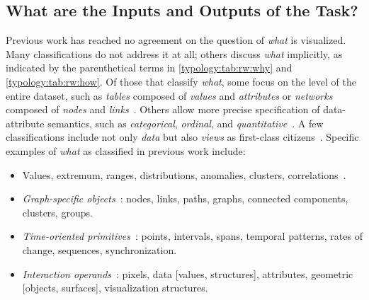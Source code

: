 \subsection{What are the Inputs and Outputs of the Task?}
\label{typology:what}


Previous work has reached no agreement on the question of {\it what} is visualized.
Many classifications do not address it at all; others discuss {\it what} implicitly, as indicated by the parenthetical terms in \autoref{typology:tab:rw:why} and \autoref{typology:tab:rw:how}.
Of those that classify {\it what}, some focus on the level of the entire dataset, such as {\it tables} composed of {\it values} and {\it attributes} or {\it networks} composed of {\it nodes} and {\it links}~\cite{Shneiderman1996}.
Others allow more precise specification of data-attribute semantics, such as {\it categorical}, {\it ordinal}, and {\it quantitative}~\cite{Card1999}.
A few classifications include not only {\it data} but also {\it views} as first-class citizens~\cite{Chi1998,Chuah1996,Heer2012,Ward2004}.
Specific examples of {\it what} as classified in previous work include: 

\begin{itemize}

    \item Values, extremum, ranges, distributions, anomalies, clusters, correlations~\cite{Amar2005}.
    
    \item {\it Graph-specific objects}~\cite{Lee2006}: nodes, links, paths, graphs, connected components, clusters, groups.
    
    \item {\it Time-oriented primitives}~\cite{Aigner2011}: points, intervals, spans, temporal patterns, rates of change, sequences, synchronization.
    
    \item {\it Interaction operands}~\cite{Ward2004}: pixels, data [values, structures], attributes, geometric [objects, surfaces], visualization structures.
    
\end{itemize}


